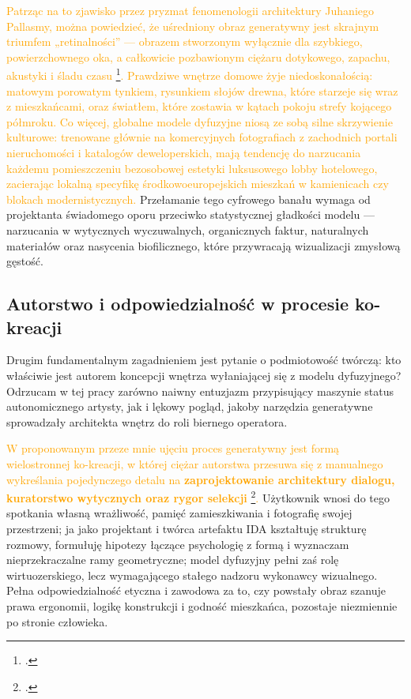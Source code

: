 \textcolor{orange}{Patrząc na to zjawisko przez pryzmat fenomenologii architektury Juhaniego Pallasmy, można powiedzieć, że uśredniony obraz generatywny jest skrajnym triumfem „retinalności” --- obrazem stworzonym wyłącznie dla szybkiego, powierzchownego oka, a całkowicie pozbawionym ciężaru dotykowego, zapachu, akustyki i śladu czasu \footcite{pallasmaa2012oczy}. Prawdziwe wnętrze domowe żyje niedoskonałością: matowym porowatym tynkiem, rysunkiem słojów drewna, które starzeje się wraz z mieszkańcami, oraz światłem, które zostawia w kątach pokoju strefy kojącego półmroku. Co więcej, globalne modele dyfuzyjne niosą ze sobą silne skrzywienie kulturowe: trenowane głównie na komercyjnych fotografiach z zachodnich portali nieruchomości i katalogów deweloperskich, mają tendencję do narzucania każdemu pomieszczeniu bezosobowej estetyki luksusowego lobby hotelowego, zacierając lokalną specyfikę środkowoeuropejskich mieszkań w kamienicach czy blokach modernistycznych.} Przełamanie tego cyfrowego banału wymaga od projektanta świadomego oporu przeciwko statystycznej gładkości modelu --- narzucania w wytycznych wyczuwalnych, organicznych faktur, naturalnych materiałów oraz nasycenia biofilicznego, które przywracają wizualizacji zmysłową gęstość.

\subsection{Autorstwo i odpowiedzialność w procesie ko-kreacji}
Drugim fundamentalnym zagadnieniem jest pytanie o podmiotowość twórczą: kto właściwie jest autorem koncepcji wnętrza wyłaniającej się z modelu dyfuzyjnego? Odrzucam w tej pracy zarówno naiwny entuzjazm przypisujący maszynie status autonomicznego artysty, jak i lękowy pogląd, jakoby narzędzia generatywne sprowadzały architekta wnętrz do roli biernego operatora.

\textcolor{orange}{W proponowanym przeze mnie ujęciu proces generatywny jest formą wielostronnej ko-kreacji, w której ciężar autorstwa przesuwa się z manualnego wykreślania pojedynczego detalu na \textbf{zaprojektowanie architektury dialogu, kuratorstwo wytycznych oraz rygor selekcji} \footcite{zimmerman2007rtd,frayling1993research}.} Użytkownik wnosi do tego spotkania własną wrażliwość, pamięć zamieszkiwania i fotografię swojej przestrzeni; ja jako projektant i twórca artefaktu IDA kształtuję strukturę rozmowy, formułuję hipotezy łączące psychologię z formą i wyznaczam nieprzekraczalne ramy geometryczne; model dyfuzyjny pełni zaś rolę wirtuozerskiego, lecz wymagającego stałego nadzoru wykonawcy wizualnego. Pełna odpowiedzialność etyczna i zawodowa za to, czy powstały obraz szanuje prawa ergonomii, logikę konstrukcji i godność mieszkańca, pozostaje niezmiennie po stronie człowieka.

